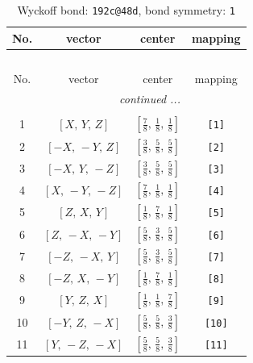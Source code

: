 \documentclass[fleqn,8pt]{jsarticle}
\begin{document}
\begin{longtable}{cccc}
\caption{Wyckoff bond: {\tt 192c@48d}, bond symmetry: {\tt 1}}
 \\
 \hline \hline
No. & vector & center & mapping \\ \hline \endfirsthead

\multicolumn{3}{l}{\tablename\ \thetable{}} \\
 \hline \hline
No. & vector & center & mapping \\ \hline \endhead

 \hline \hline
\multicolumn{3}{r}{\footnotesize\it continued ...} \\ \endfoot

 \hline \hline
\multicolumn{3}{r}{} \\ \endlastfoot

1 & $\left[ X,\, Y,\, Z \right]$ & $\left[ \frac{7}{8},\, \frac{1}{8},\, \frac{1}{8} \right]$ & {\tt [1]} \\ \hline
2 & $\left[ - X,\, - Y,\, Z \right]$ & $\left[ \frac{3}{8},\, \frac{5}{8},\, \frac{5}{8} \right]$ & {\tt [2]} \\ \hline
3 & $\left[ - X,\, Y,\, - Z \right]$ & $\left[ \frac{3}{8},\, \frac{5}{8},\, \frac{5}{8} \right]$ & {\tt [3]} \\ \hline
4 & $\left[ X,\, - Y,\, - Z \right]$ & $\left[ \frac{7}{8},\, \frac{1}{8},\, \frac{1}{8} \right]$ & {\tt [4]} \\ \hline
5 & $\left[ Z,\, X,\, Y \right]$ & $\left[ \frac{1}{8},\, \frac{7}{8},\, \frac{1}{8} \right]$ & {\tt [5]} \\ \hline
6 & $\left[ Z,\, - X,\, - Y \right]$ & $\left[ \frac{5}{8},\, \frac{3}{8},\, \frac{5}{8} \right]$ & {\tt [6]} \\ \hline
7 & $\left[ - Z,\, - X,\, Y \right]$ & $\left[ \frac{5}{8},\, \frac{3}{8},\, \frac{5}{8} \right]$ & {\tt [7]} \\ \hline
8 & $\left[ - Z,\, X,\, - Y \right]$ & $\left[ \frac{1}{8},\, \frac{7}{8},\, \frac{1}{8} \right]$ & {\tt [8]} \\ \hline
9 & $\left[ Y,\, Z,\, X \right]$ & $\left[ \frac{1}{8},\, \frac{1}{8},\, \frac{7}{8} \right]$ & {\tt [9]} \\ \hline
10 & $\left[ - Y,\, Z,\, - X \right]$ & $\left[ \frac{5}{8},\, \frac{5}{8},\, \frac{3}{8} \right]$ & {\tt [10]} \\ \hline
11 & $\left[ Y,\, - Z,\, - X \right]$ & $\left[ \frac{5}{8},\, \frac{5}{8},\, \frac{3}{8} \right]$ & {\tt [11]} \\ \hline

\end{longtable}
\end{document}
